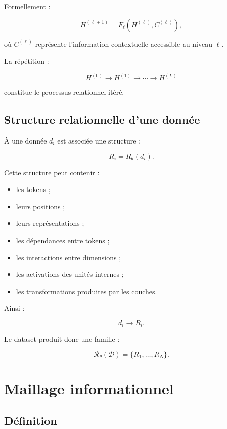 \documentclass[11pt,a4paper]{article}
\newcommand{\D}{\mathcal D}
\begin{document}
Formellement :

\[
H^{(\ell+1)}
=
F_\ell
\left(
H^{(\ell)},C^{(\ell)}
\right),
\]

où $C^{(\ell)}$ représente l'information contextuelle accessible au niveau
$\ell$.

La répétition :

\[
H^{(0)}
\rightarrow
H^{(1)}
\rightarrow
\cdots
\rightarrow
H^{(L)}
\]

constitue le processus relationnel itéré.

\subsection{Structure relationnelle d'une donnée}

À une donnée $d_i$ est associée une structure :

\[
R_i
=
R_\theta(d_i).
\]

Cette structure peut contenir :

\begin{itemize}
    \item les tokens ;
    \item leurs positions ;
    \item leurs représentations ;
    \item les dépendances entre tokens ;
    \item les interactions entre dimensions ;
    \item les activations des unités internes ;
    \item les transformations produites par les couches.
\end{itemize}

Ainsi :

\[
d_i
\longrightarrow
R_i.
\]

Le dataset produit donc une famille :

\[
\mathcal R_\theta(\D)
=
\{R_1,\ldots,R_N\}.
\]

\section{Maillage informationnel}

\subsection{Définition}
\end{document}
